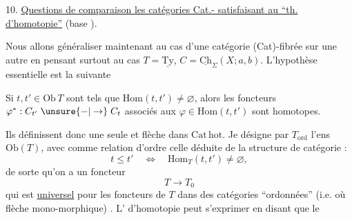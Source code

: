 
10. \uline{Questions de comparaison  les catégories Cat.-  satisfaisant au ``th. d'homotopie''} (base ).

Nous allons généraliser maintenant au cas d'une catégorie (Cat)-fibrée sur une autre
\margin{\unsure{(}}
en pensant surtout au cas $T=\underline{\mathrm{Ty}}$, $C=\underline{\mathrm{Ch}}_\Sigma(X;a,b)$. L'hypothèse essentielle est la suivante

Si $t,t'\in\mathrm{Ob}\,T$ sont tels que $\mathrm{Hom}(t,t')\ne\varnothing$, alors les foncteurs $\varphi^*:C_{t'}\mathrel{\unsure{-|\to}}C_t$ associés aux $\varphi\in\mathrm{Hom}(t,t')$ sont homotopes.

 Ils définissent donc une seule et  flèche dans $\mathrm{Cat\,hot}$.  Je désigne par $T_{\mathrm{ord}}$  l'ens $\mathrm{Ob}(T)$, avec comme relation d'ordre celle déduite de la structure de catégorie :
\[
t\leq t'\quad\Longleftrightarrow\quad\mathrm{Hom}_T(t,t')\ne\varnothing,
\]
 de sorte qu'on a un foncteur
\[
T\longrightarrow T_0
\]
qui est \uline{universel} pour les foncteurs de $T$ dans des catégories ``ordonnées'' (i.e. où  flèche  mono-morphique) . L' d'homotopie peut s'exprimer en disant que le  


